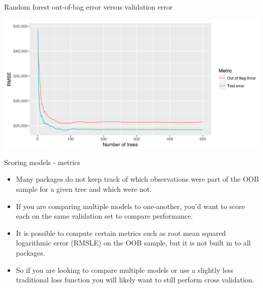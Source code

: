 \documentclass[
  10pt,
  ignorenonframetext,
]{beamer}
\providecommand{\tightlist}{%
  \setlength{\itemsep}{0pt}\setlength{\parskip}{0pt}}
\begin{document}
\begin{frame}{Random forest out-of-bag error versus validation error}
\protect\hypertarget{random-forest-out-of-bag-error-versus-validation-error}{}

\includegraphics{figure/random_trees_fig1.PNG}

\end{frame}

\begin{frame}{Scoring models - metrics}
\protect\hypertarget{scoring-models---metrics}{}

\begin{itemize}
\tightlist
\item
  Many packages do not keep track of which observations were part of the
  OOB sample for a given tree and which were not.
\item
  If you are comparing multiple models to one-another, you'd want to
  score each on the same validation set to compare performance.
\item
  It is possible to compute certain metrics such as root mean squared
  logarithmic error (RMSLE) on the OOB sample, but it is not built in to
  all packages.
\item
  So if you are looking to compare multiple models or use a slightly
  less traditional loss function you will likely want to still perform
  cross validation.
\end{itemize}

\end{frame}
\end{document}
